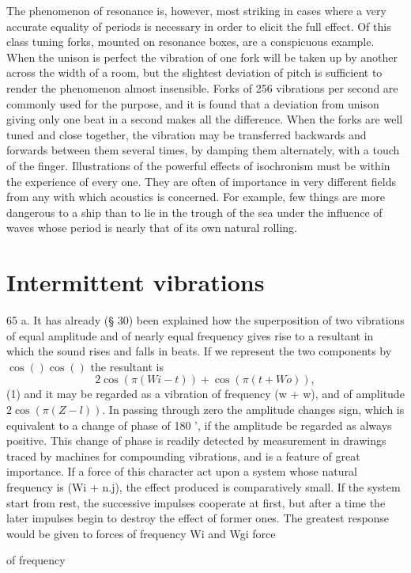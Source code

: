 The phenomenon of resonance is, however, most striking in cases where a very
accurate equality of periods is necessary in order to elicit the full effect.
Of this class tuning forks, mounted on resonance boxes, are a conspicuous
example. When the unison is perfect the vibration of one fork will be taken up
by another across the width of a room, but the slightest deviation of pitch is
sufficient to render the phenomenon almost insensible. Forks of 256 vibrations
per second are commonly used for the purpose, and it is found that a deviation
from unison giving only one beat in a second makes all the difference. When the
forks are well tuned and close together, the vibration may be transferred
backwards and forwards between them several times, by damping them alternately,
with a touch of the finger. Illustrations of the powerful effects of
isochronism must be within the experience of every one. They are often of
importance in very different fields from any with which acoustics is concerned.
For example, few things are more dangerous to a ship than to lie in the trough
of the sea under the influence of waves whose period is nearly that of its own
natural rolling.

\section{Intermittent vibrations}
65 a. It has already (§ 30) been explained how the superposition
of two vibrations of equal amplitude and of nearly equal frequency gives rise
to a resultant in which the sound rises and falls in beats. If we represent the
two components by \( \cos() \cos()  \) the resultant is
\[ 2 \cos (\pi (Wi - t)) + \cos (\pi (t + Wo)),\]
(1) and it may be regarded as a vibration of frequency (w + w), and of
amplitude \(2 \cos (\pi (Z - l)) \). In passing through zero the amplitude changes
sign, which is equivalent to a change of phase of 180 ’, if the amplitude be
regarded as always positive. This change of phase is readily detected by
measurement in drawings traced by machines for compounding vibrations, and is a
feature of great importance. If a force of this character act upon a system
whose natural frequency is (Wi + n.j), the effect produced is comparatively
small. If the system start from rest, the successive impulses cooperate at
first, but after a time the later impulses begin to destroy the effect of
former ones. The greatest response would be given to forces of frequency Wi and
Wgi force

of frequency

